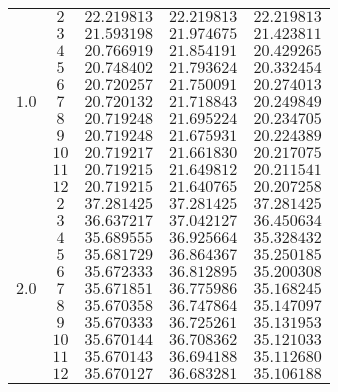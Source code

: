 \documentclass[
    a4paper, aps, twocolumn, floatfix, superscriptaddress,
    nofootinbib]{revtex4-1}
\newcommand{\1}{\mathds{1}}
\begin{document}
\begin{table}
\begin{ruledtabular}
\begin{tabular}{c|c|ccc}
                         &  $2$  & $22.219813$ & $22.219813$ & $22.219813$ \\
                         &  $3$  & $21.593198$ & $21.974675$ & $21.423811$ \\
                         &  $4$  & $20.766919$ & $21.854191$ & $20.429265$ \\
                         &  $5$  & $20.748402$ & $21.793624$ & $20.332454$ \\
                         &  $6$  & $20.720257$ & $21.750091$ & $20.274013$ \\
                  $1.0$  &  $7$  & $20.720132$ & $21.718843$ & $20.249849$ \\
                         &  $8$  & $20.719248$ & $21.695224$ & $20.234705$ \\
                         &  $9$  & $20.719248$ & $21.675931$ & $20.224389$ \\
                         &  $10$ & $20.719217$ & $21.661830$ & $20.217075$ \\
                         &  $11$ & $20.719215$ & $21.649812$ & $20.211541$ \\
                         &  $12$ & $20.719215$ & $21.640765$ & $20.207258$ \\
                         \hline

                         &  $2$  & $37.281425$ & $37.281425$ & $37.281425$ \\
                         &  $3$  & $36.637217$ & $37.042127$ & $36.450634$ \\
                         &  $4$  & $35.689555$ & $36.925664$ & $35.328432$ \\
                         &  $5$  & $35.681729$ & $36.864367$ & $35.250185$ \\
                         &  $6$  & $35.672333$ & $36.812895$ & $35.200308$ \\
                  $2.0$  &  $7$  & $35.671851$ & $36.775986$ & $35.168245$ \\
                         &  $8$  & $35.670358$ & $36.747864$ & $35.147097$ \\
                         &  $9$  & $35.670333$ & $36.725261$ & $35.131953$ \\
                         &  $10$ & $35.670144$ & $36.708362$ & $35.121033$ \\
                         &  $11$ & $35.670143$ & $36.694188$ & $35.112680$ \\
                         &  $12$ & $35.670127$ & $36.683281$ & $35.106188$
            \end{tabular}
        \end{ruledtabular}
        \label{tab:N6}
    \end{table}
\end{document}
